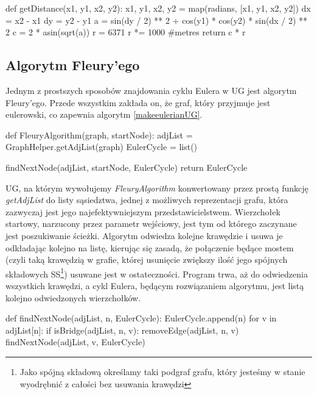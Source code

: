 \documentclass[a4paper, 12pt, twoside, openright]{article}
\begin{document}
\begin{algorithm}[caption={\textit{getDistance} funkcja obliczająca odległości między rzeczywistymi budynkami, generująca wagi dla krawędzi. Przy jej implementacji sugerowano się wzorami \ref{haversie} -  \ref{haversieD}.}, label={getDistance}]
def getDistance(x1, y1, x2, y2):
	x1, y1, x2, y2 = map(radians, [x1, y1, x2, y2])
	dx = x2 - x1
	dy = y2 - y1
	a = sin(dy / 2) ** 2 + cos(y1) * cos(y2) * sin(dx / 2) ** 2
	c = 2 * asin(sqrt(a))
	r = 6371
	r *= 1000	#metres
	return c * r
\end{algorithm}


\newpage
\subsection{Algorytm Fleury’ego} \label{FleuryAlgo}
\indent\par
	Jednym z prostszych sposobów znajdowania cyklu Eulera w UG jest algorytm Fleury'ego. Przede wszystkim zakłada on, że graf, który przyjmuje jest eulerowski, co zapewnia algorytm \ref{makeeulerianUG}. 
\begin{algorithm}[caption={\textit{FleuryAlgorithm} wyszukujący ścieżkę w grafie nieskierowanym}, label={FleuryAlgorithm}]
	def FleuryAlgorithm(graph, startNode):
	adjList = GraphHelper.getAdjList(graph)
	EulerCycle = list()
	
	findNextNode(adjList, startNode, EulerCycle)
	return EulerCycle
\end{algorithm}	
	UG, na którym wywołujemy \textit{FleuryAlgorithm} konwertowany przez prostą funkcję \textit{getAdjList} do listy sąsiedztwa, jednej z możliwych reprezentacji grafu, która zazwyczaj jest jego najefektywniejszym przedstawicielstwem. Wierzchołek startowy, narzucony przez parametr wejściowy, jest tym od którego zaczynane jest poszukiwanie ścieżki. Algorytm odwiedza kolejne krawędzie i usuwa je odkładając kolejno na listę, kierując się zasadą, że połączenie będące mostem (czyli taką krawędzią w grafie, której usunięcie zwiększy ilość jego spójnych składowych SS\footnote{ Jako spójną składową określamy taki podgraf grafu, który jesteśmy w stanie wyodrębnić z całości bez usuwania krawędzi}) usuwane jest w ostateczności. Program trwa, aż do odwiedzenia wszystkich krawędzi, a cykl Eulera, będącym rozwiązaniem algorytmu, jest listą kolejno odwiedzonych wierzchołków.

\begin{algorithm}[caption={\textit{findNextNode} rekurencyjna funkcja pomocnicza dla \textit{FleuryAlgorithm} }, label={findNextNode}]
	def findNextNode(adjList, n, EulerCycle):
	EulerCycle.append(n)
	for v in adjList[n]:
	if isBridge(adjList, n, v):
	removeEdge(adjList, n, v)
	findNextNode(adjList, v, EulerCycle)
\end{algorithm}
\end{document}
